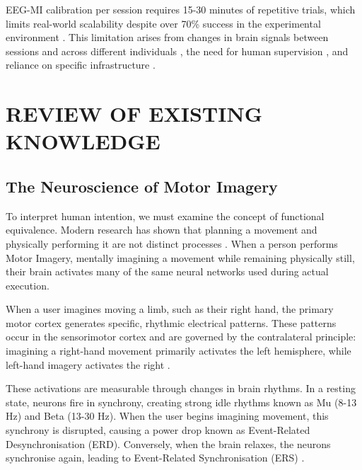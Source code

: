 \documentclass[a4paper, 11pt, openany]{report}
\let\cite\citep
\begin{document}
    EEG-MI calibration per session requires 15-30 minutes of repetitive trials, which limits 
    real-world scalability despite over 70\% success in the experimental environment 
    \cite{Giles2022,Kueper2024}. This limitation arises from changes in brain signals 
    between sessions and across different individuals \cite{Sugiyama2008}, the need for 
    human supervision \cite{Giles2022}, and reliance on specific infrastructure \cite{Lotte2018}.





\chapter{REVIEW OF EXISTING KNOWLEDGE}

    \section{The Neuroscience of Motor Imagery}
    To interpret human intention, we must examine the concept of functional 
    equivalence. Modern research has shown that planning a movement and 
    physically performing it are not distinct processes \cite{Jeannerod1995}. 
    When a person performs Motor Imagery, mentally imagining a movement while 
    remaining physically still, their brain activates many of the same neural 
    networks used during actual execution.

    When a user imagines moving a limb, such as their right hand, the primary 
    motor cortex generates specific, rhythmic electrical patterns. These patterns 
    occur in the sensorimotor cortex and are governed by the contralateral 
    principle: imagining a right-hand movement primarily activates the left 
    hemisphere, while left-hand imagery activates the right \cite{Wolpaw2002}.

    These activations are measurable through changes in brain rhythms. In a 
    resting state, neurons fire in synchrony, creating strong idle rhythms known 
    as Mu (8-13 Hz) and Beta (13-30 Hz). When the user begins imagining movement, 
    this synchrony is disrupted, causing a power drop known as Event-Related 
    Desynchronisation (ERD). Conversely, when the brain relaxes, the neurons 
    synchronise again, leading to Event-Related Synchronisation (ERS) \cite{Pfurtscheller2001}.
\end{document}
